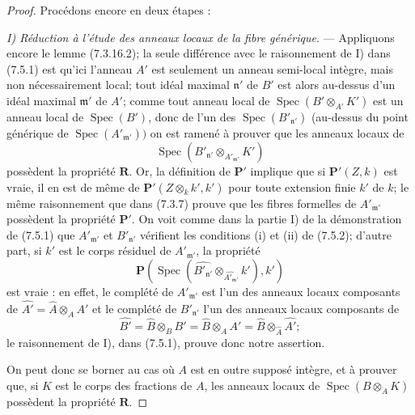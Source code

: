 \begin{proof}
Procédons encore en deux étapes :

\emph{I) Réduction à l'étude des anneaux locaux de la fibre générique.} ---
Appliquons encore le lemme (7.3.16.2); la seule différence avec le
raisonnement de I) dans (7.5.1) est qu'ici l'anneau $A'$ est seulement un
anneau semi-local intègre, mais non nécessairement local; tout idéal maximal
$\mathfrak n'$ de $B'$ est alors au-dessus d'un idéal maximal $\mathfrak m'$
de $A'$; comme tout anneau local de
$\operatorname{Spec}(B'\otimes_{A'}K')$ est un anneau local de
$\operatorname{Spec}(B')$, donc de l'un des
$\operatorname{Spec}(B'_{\mathfrak n'})$ (au-dessus du point générique de
$\operatorname{Spec}(A'_{\mathfrak m'}))$ on est ramené à prouver que les
anneaux locaux de
\[
\operatorname{Spec}(B'_{\mathfrak n'}
\otimes_{A'_{\mathfrak m'}}K')
\]
possèdent la propriété $\boldsymbol R$. Or, la définition de
$\boldsymbol P'$ implique que si $\boldsymbol P'(Z,k)$ est vraie, il en est
de même de $\boldsymbol P'(Z\otimes_k k',k')$ pour toute extension finie
$k'$ de $k$; le même raisonnement que dans (7.3.7) prouve que les fibres
formelles de $A'_{\mathfrak m'}$ possèdent la propriété $\boldsymbol P'$.
On voit comme dans la partie I) de la démonstration de (7.5.1) que
$A'_{\mathfrak m'}$ et $B'_{\mathfrak n'}$ vérifient les conditions (i) et
(ii) de (7.5.2); d'autre part, si $k'$ est le corps résiduel de
$A'_{\mathfrak m'}$, la propriété
\[
\boldsymbol P(\operatorname{Spec}(\widehat{B'_{\mathfrak n'}}
\otimes_{\widehat{A'_{\mathfrak m'}}}k'),k')
\]
est vraie : en effet, le complété de $A'_{\mathfrak m'}$ est l'un des
anneaux locaux composants de
$\widehat{A'}=\widehat A\otimes_A A'$ et le complété de
$B'_{\mathfrak n'}$ l'un des anneaux locaux composants de
\[
\widehat{B'}=\widehat B\otimes_B B'
=\widehat B\otimes_A A'
=\widehat B\otimes_{\widehat A}\widehat{A'};
\]
le raisonnement de I), dans (7.5.1), prouve donc notre assertion.

On peut donc se borner au cas où $A$ est en outre supposé intègre, et à
prouver que, si $K$ est le corps des fractions de $A$, les anneaux locaux de
$\operatorname{Spec}(B\otimes_A K)$ possèdent la propriété
$\boldsymbol R$.


\end{proof}
